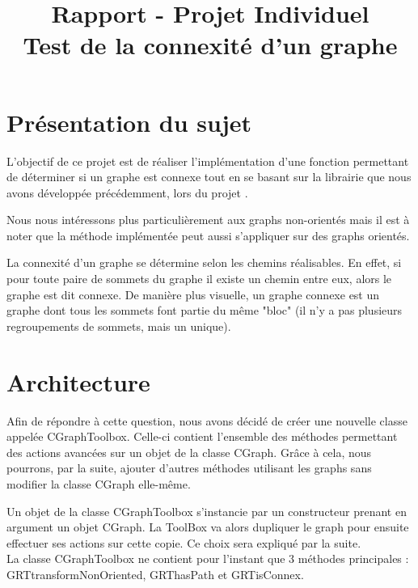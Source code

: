 
\title{Rapport - Projet Individuel \\\Large Test de la connexité d'un graphe}
\fancyhf{}
\lhead{\leftmark}


	\maketitle
	\tableofcontents
	\chapter{Présentation du sujet}
		L'objectif de ce projet est de réaliser l'implémentation d'une fonction permettant de déterminer si un graphe est connexe tout en se basant sur la librairie que nous avons développée précédemment, lors du projet .		
		
		Nous nous intéressons plus particulièrement aux graphs non-orientés mais il est à noter que la méthode implémentée peut aussi s'appliquer sur des graphs orientés.
		
		La connexité d'un graphe se détermine selon les chemins réalisables. En effet, si pour toute paire de sommets du graphe il existe un chemin entre eux, alors le graphe est dit connexe. De manière plus visuelle, un graphe connexe est un graphe dont tous les sommets font partie du même "bloc" (il n'y a pas plusieurs regroupements de sommets, mais un unique).
	
	\chapter{Architecture}
		Afin de répondre à cette question, nous avons décidé de créer une nouvelle classe appelée CGraphToolbox. Celle-ci contient l'ensemble des méthodes permettant des actions avancées sur un objet de la classe CGraph. Grâce à cela, nous pourrons, par la suite, ajouter d'autres méthodes utilisant les graphs sans modifier la classe CGraph elle-même.
		
		Un objet de la classe CGraphToolbox s'instancie par un constructeur prenant en argument un objet CGraph. La ToolBox va alors dupliquer le graph pour ensuite effectuer ses actions sur cette copie. Ce choix sera expliqué par la suite.\\
		
		La classe CGraphToolbox ne contient pour l'instant que 3 méthodes principales : GRTtransformNonOriented, GRThasPath et GRTisConnex.\\
		

